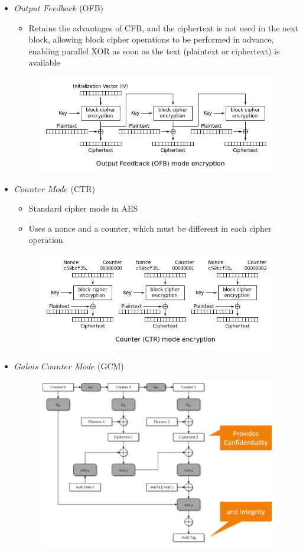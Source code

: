 \documentclass[10pt,a4paper]{report}
\begin{document}
\begin{itemize}
\begin{figure}[H]
\end{figure}
\item $Output$ $Feedback$ (OFB)
\begin{itemize}
\item Retains the advantages of CFB, and the ciphertext is not used in the next block, allowing block cipher operations to be performed in advance, enabling parallel XOR as soon as the text (plaintext or ciphertext) is available
\end{itemize}
\begin{figure}[H]
\centering
\includegraphics[scale=0.5]{6.png}
\end{figure}
\item $Counter$ $Mode$ (CTR)
\begin{itemize}
\item Standard cipher mode in AES
\item Uses a nonce and a counter, which must be different in each cipher operation
\end{itemize}
\begin{figure}[H]
\centering
\includegraphics[scale=0.5]{7.png}
\end{figure}
\item $Galois$ $Counter$ $Mode$ (GCM)
\begin{figure} [H]
\centering
\includegraphics[scale=0.4]{8.png}

\end{figure}
\end{itemize}
\end{document}
